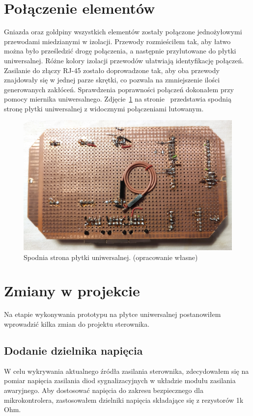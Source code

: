 \documentclass[11pt]{report}
\begin{document}
 \section{Połączenie elementów}
 Gniazda oraz goldpiny wszystkich elementów zostały połączone jednożyłowymi przewodami miedzianymi w izolacji. Przewody rozmieściłem tak, aby łatwo można było prześledzić drogę połączenia, a następnie przylutowane do płytki uniwersalnej. Różne kolory izolacji przewodów ułatwiają identyfikację połączeń. Zasilanie do złączy RJ-45 zostało doprowadzone tak, aby oba przewody znajdowały się w jednej parze skrętki, co pozwala na zmniejszenie ilości generowanych zakłóceń.
 Sprawdzenia poprawności połączeń dokonałem przy pomocy miernika uniwersalnego.
   Zdjęcie~\ref{fig:uni_dol} na stronie~\pageref{fig:uni_dol} przedstawia spodnią stronę płytki uniwersalnej z widocznymi połączeniami lutowanym.
\begin{figure}[ht]
\centering
\includegraphics[width=0.8 \textwidth]{fig/plytka_dol.jpg}
\caption{Spodnia strona płytki uniwersalnej. (opracowanie własne)}
\label{fig:uni_dol}
\end{figure}

 \section{Zmiany w projekcie}
 Na etapie wykonywania prototypu na płytce uniwersalnej postanowiłem wprowadzić kilka zmian do projektu sterownika.
 \subsection{Dodanie dzielnika napięcia}
 W celu wykrywania aktualnego źródła zasilania sterownika, zdecydowałem się na pomiar napięcia zasilania diod sygnalizacyjnych w układzie modułu zasilania awaryjnego. Aby dostosować napięcia do zakresu bezpiecznego dla mikrokontrolera, zastosowałem dzielniki napięcia składające się z rezystorów 1k Ohm.
\end{document}
